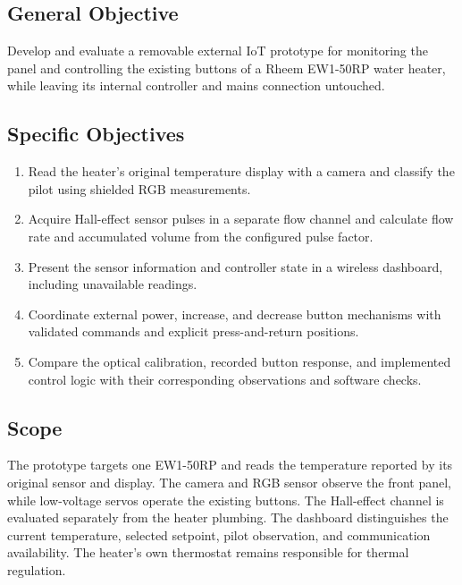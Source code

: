 \subsection*{General Objective}
Develop and evaluate a removable external IoT prototype for monitoring the panel and controlling the existing buttons of a Rheem EW1-50RP water heater, while leaving its internal controller and mains connection untouched.

\subsection*{Specific Objectives}
\begin{enumerate}[label=SO\arabic*.]
\item Read the heater's original temperature display with a camera and classify the pilot using shielded RGB measurements.
\item Acquire Hall-effect sensor pulses in a separate flow channel and calculate flow rate and accumulated volume from the configured pulse factor.
\item Present the sensor information and controller state in a wireless dashboard, including unavailable readings.
\item Coordinate external power, increase, and decrease button mechanisms with validated commands and explicit press-and-return positions.
\item Compare the optical calibration, recorded button response, and implemented control logic with their corresponding observations and software checks.
\end{enumerate}

\subsection*{Scope}
The prototype targets one EW1-50RP and reads the temperature reported by its original sensor and display. The camera and RGB sensor observe the front panel, while low-voltage servos operate the existing buttons. The Hall-effect channel is evaluated separately from the heater plumbing. The dashboard distinguishes the current temperature, selected setpoint, pilot observation, and communication availability. The heater's own thermostat remains responsible for thermal regulation.
